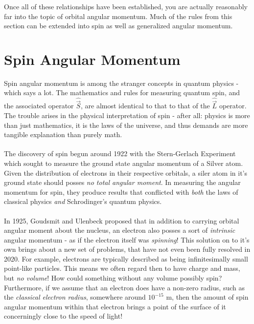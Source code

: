 \documentclass[12pt,letterpaper]{book}
\begin{document}
Once all of these relationships have been established, you are actually reasonably far into the topic of orbital angular momentum. Much of the rules from this section can be extended into spin as well as generalized angular momentum.


\section{Spin Angular Momentum}

\paragraph*{}Spin angular momentum is among the stranger concepts in quantum physics - which says a lot. The mathematics and rules for measuring quantum spin, and the associated operator $\hat{\vec{S}}$, are almost identical to that to that of the $\hat{\vec{L}}$ operator. The trouble arises in the physical interpretation of spin - after all: physics is more than just mathematics, it is the laws of the universe, and thus demands are more tangible explanation than purely math.

\paragraph*{}The discovery of spin begun around 1922 with the Stern-Gerlach Experiment which sought to measure the ground state angular momentum of a Silver atom. Given the distribution of electrons in their respective orbitals, a siler atom in it's ground state should posses \textit{no total angular moment}. In measuring the angular momentum for spin, they produce results that conflicted with \textit{both} the laws of classical physics \textit{and} Schrodinger's quantum physics.

\paragraph*{}In 1925, Goudsmit and Ulenbeck proposed that in addition to carrying orbital angular moment about the nucleus, an electron also posses a sort of \textit{intrinsic} angular momentum - as if the electron itself was \textit{spinning}! This solution on to it's own brings about a new set of problems, that have not even been fully resolved in 2020. For example, electrons are typically described as being infinitesimally small point-like particles. This means we often regard then to have charge and mass, but \textit{no volume}! How could something without any volume possibly spin? Furthermore, if we assume that an electron does have a non-zero radius, such as the \textit{classical electron radius}, somewhere around $10^{-15}$ m, then the amount of spin angular momentum within that electron brings a point of the surface of it concerningly close to the speed of light!
\end{document}
